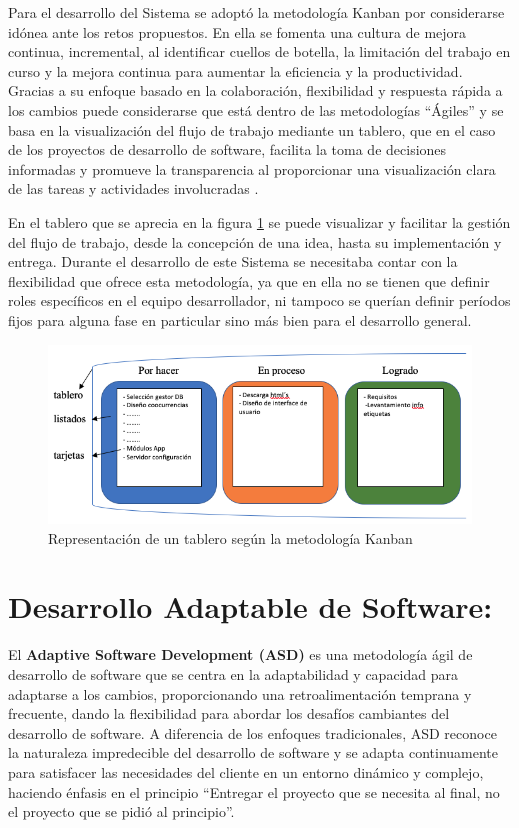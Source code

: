 \documentclass[
  10,
  openany]{book}
\begin{document}
Para el desarrollo del Sistema se adoptó la metodología Kanban por considerarse idónea ante los retos propuestos. En ella se fomenta una cultura de mejora continua, incremental, al identificar cuellos de botella, la limitación del trabajo en curso y la mejora continua para aumentar la eficiencia y la productividad. Gracias a su enfoque basado en la colaboración, flexibilidad y respuesta rápida a los cambios puede considerarse que está dentro de las metodologías ``Ágiles'' y se basa en la visualización del flujo de trabajo mediante un tablero, que en el caso de los proyectos de desarrollo de software, facilita la toma de decisiones informadas y promueve la transparencia al proporcionar una visualización clara de las tareas y actividades involucradas \citep{stephens2015}.

En el tablero que se aprecia en la figura \ref{fig:metkanban} se puede visualizar y facilitar la gestión del flujo de trabajo, desde la concepción de una idea, hasta su implementación y entrega. Durante el desarrollo de este Sistema se necesitaba contar con la flexibilidad que ofrece esta metodología, ya que en ella no se tienen que definir roles específicos en el equipo desarrollador, ni tampoco se querían definir períodos fijos para alguna fase en particular sino más bien para el desarrollo general.

\begin{figure}

{\centering \includegraphics[width=0.7\linewidth]{images/04-metodologia/01_kanban} 

}

\caption{Representación de un tablero según la metodología Kanban}\label{fig:metkanban}
\end{figure}

\hypertarget{mmasd}{%
\section{Desarrollo Adaptable de Software:}\label{mmasd}}

El \textbf{Adaptive Software Development (ASD)} \citep{highsmith2000} es una metodología ágil de desarrollo de software que se centra en la adaptabilidad y capacidad para adaptarse a los cambios, proporcionando una retroalimentación temprana y frecuente, dando la flexibilidad para abordar los desafíos cambiantes del desarrollo de software. A diferencia de los enfoques tradicionales, ASD reconoce la naturaleza impredecible del desarrollo de software y se adapta continuamente para satisfacer las necesidades del cliente en un entorno dinámico y complejo, haciendo énfasis en el principio ``Entregar el proyecto que se necesita al final, no el proyecto que se pidió al principio''.
\end{document}

